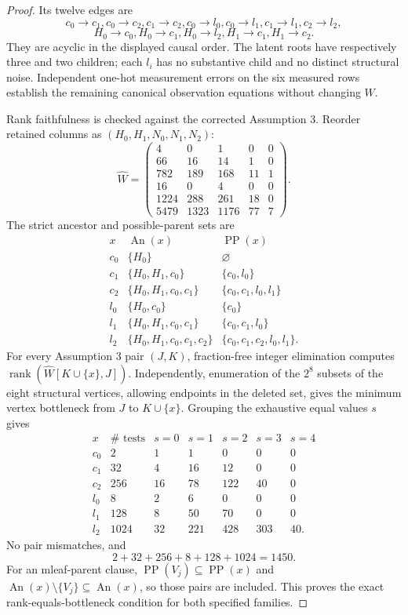 \documentclass{article}
\begin{document}
\begin{proof}
Its twelve edges are
\[
c_0\to c_1, c_0\to c_2, c_1\to c_2, c_0\to l_0, c_0\to l_1, c_1\to l_1, c_2\to l_2,
\]
\[
H_0\to c_0, H_0\to c_1, H_0\to l_2, H_1\to c_1, H_1\to c_2.
\]
They are acyclic in the displayed causal order. The latent roots have respectively three and two children; each \(l_i\) has no substantive child and no distinct structural noise. Independent one-hot measurement errors on the six measured rows establish the remaining canonical observation equations without changing \(W\).

Rank faithfulness is checked against the corrected Assumption 3. Reorder retained columns as \((H_0,H_1,N_0,N_1,N_2)\):
\[
\widehat W=
\begin{pmatrix}
4&0&1&0&0\\66&16&14&1&0\\782&189&168&11&1\\
16&0&4&0&0\\1224&288&261&18&0\\5479&1323&1176&77&7
\end{pmatrix}.
\]
The strict ancestor and possible-parent sets are
\[
\begin{array}{c|c|c}
x&\operatorname{An}(x)&\operatorname{PP}(x)\\ \hline
c_0&\{H_0\}&\varnothing\\
c_1&\{H_0,H_1,c_0\}&\{c_0,l_0\}\\
c_2&\{H_0,H_1,c_0,c_1\}&\{c_0,c_1,l_0,l_1\}\\
l_0&\{H_0,c_0\}&\{c_0\}\\
l_1&\{H_0,H_1,c_0,c_1\}&\{c_0,c_1,l_0\}\\
l_2&\{H_0,H_1,c_0,c_1,c_2\}&\{c_0,c_1,c_2,l_0,l_1\}.
\end{array}
\]
For every Assumption 3 pair \((J,K)\), fraction-free integer elimination computes \(\operatorname{rank}(\widehat W[K\cup\{x\},J])\). Independently, enumeration of the \(2^8\) subsets of the eight structural vertices, allowing endpoints in the deleted set, gives the minimum vertex bottleneck from \(J\) to \(K\cup\{x\}\). Grouping the exhaustive equal values \(s\) gives
\[
\begin{array}{c|r|rrrrr}
x&\#\text{ tests}&s=0&s=1&s=2&s=3&s=4\\ \hline
c_0&2&1&1&0&0&0\\
c_1&32&4&16&12&0&0\\
c_2&256&16&78&122&40&0\\
l_0&8&2&6&0&0&0\\
l_1&128&8&50&70&0&0\\
l_2&1024&32&221&428&303&40.
\end{array}
\]
No pair mismatches, and
\[
2+32+256+8+128+1024=1450.
\]
For an mleaf-parent clause, \(\operatorname{PP}(V_j)\subseteq\operatorname{PP}(x)\) and \(\operatorname{An}(x)\setminus\{V_j\}\subseteq\operatorname{An}(x)\), so those pairs are included. This proves the exact rank-equals-bottleneck condition for both specified families.


\end{proof}
\end{document}
